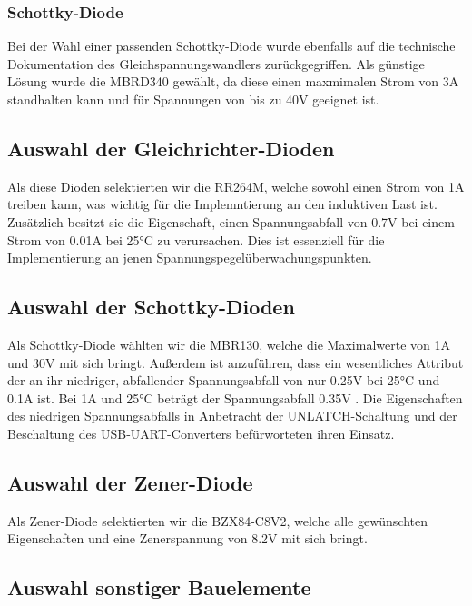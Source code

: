 \subsubsection{Schottky-Diode}
Bei der Wahl einer passenden Schottky-Diode wurde ebenfalls auf die technische Dokumentation des Gleichspannungswandlers zurückgegriffen.
Als günstige Lösung wurde die MBRD340 gewählt, da diese einen maxmimalen Strom von 3A standhalten kann und für Spannungen von bis zu 40V geeignet ist.

\subsection{Auswahl der Gleichrichter-Dioden}

Als diese Dioden selektierten wir die RR264M, welche sowohl einen Strom von 1A treiben kann, was wichtig für die Implemntierung an den induktiven Last ist.
Zusätzlich besitzt sie die Eigenschaft, einen Spannungsabfall von 0.7V bei einem Strom von 0.01A bei 25°C zu verursachen.
Dies ist essenziell für die Implementierung an jenen Spannungspegelüberwachungspunkten.

\subsection{Auswahl der Schottky-Dioden}

Als Schottky-Diode wählten wir die MBR130, welche die Maximalwerte von 1A und 30V mit sich bringt.
Außerdem ist anzuführen, dass ein wesentliches Attribut der an ihr niedriger, abfallender Spannungsabfall von nur 0.25V bei 25°C und 0.1A ist.
Bei 1A und 25°C beträgt der Spannungsabfall 0.35V .
Die Eigenschaften des niedrigen Spannungsabfalls in Anbetracht der UNLATCH-Schaltung und der Beschaltung des USB-UART-Converters befürworteten ihren Einsatz.

\subsection{Auswahl der Zener-Diode}

Als Zener-Diode selektierten wir die BZX84-C8V2, welche alle gewünschten Eigenschaften und eine Zenerspannung von 8.2V mit sich bringt.

\subsection{Auswahl sonstiger Bauelemente}

